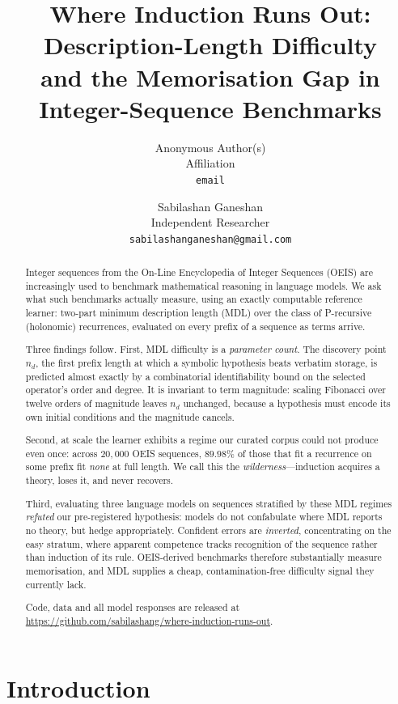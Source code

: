 \documentclass[10pt]{article}
\title{\bf Where Induction Runs Out: Description-Length Difficulty\\
and the Memorisation Gap in Integer-Sequence Benchmarks}
\author{Anonymous Author(s)\\Affiliation\\\texttt{email}}
\author{Sabilashan Ganeshan\\Independent Researcher\\
          \texttt{sabilashanganeshan@gmail.com}}
\date{}
\newif\ifanon
\theoremstyle{definition}
\theoremstyle{plain}
\newcommand{\nd}{n_{d}}
\begin{document}
\maketitle

\begin{abstract}
Integer sequences from the On-Line Encyclopedia of Integer Sequences (OEIS)
are increasingly used to benchmark mathematical reasoning in language models.
We ask what such benchmarks actually measure, using an exactly computable
reference learner: two-part minimum description length (MDL) over the class of
P-recursive (holonomic) recurrences, evaluated on every prefix of a sequence as
terms arrive.

Three findings follow. First, MDL difficulty is a \emph{parameter count}. The
discovery point $\nd$, the first prefix length at which a symbolic hypothesis
beats verbatim storage, is predicted almost exactly by a combinatorial
identifiability bound on the selected operator's order and degree. It is
invariant to term magnitude: scaling Fibonacci over twelve orders of magnitude
leaves $\nd$ unchanged, because a hypothesis must encode its own initial
conditions and the magnitude cancels.

Second, at scale the learner exhibits a regime our curated corpus could not
produce even once: across $20{,}000$ OEIS sequences, $89.98\%$ of those that
fit a recurrence on some prefix fit \emph{none} at full length. We call this
the \emph{wilderness}---induction acquires a theory, loses it, and never
recovers.

Third, evaluating three language models on sequences stratified by these MDL
regimes \emph{refuted} our pre-registered hypothesis: models do not confabulate
where MDL reports no theory, but hedge appropriately. Confident errors are
\emph{inverted}, concentrating on the easy stratum, where apparent competence
tracks recognition of the sequence rather than induction of its rule.
OEIS-derived benchmarks therefore substantially measure memorisation, and
MDL supplies a cheap, contamination-free difficulty signal they currently lack.
\ifanon
Code and data will be released upon acceptance.
\else
Code, data and all model responses are released at
\url{https://github.com/sabilashang/where-induction-runs-out}.
\fi
\end{abstract}

\section{Introduction}
\end{document}
